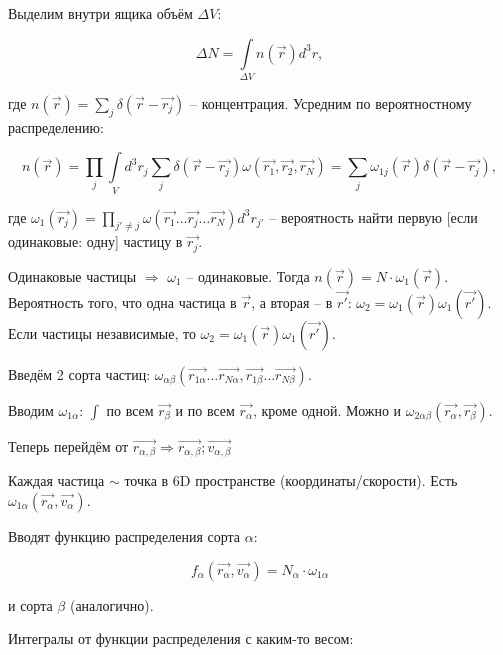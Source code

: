 \documentclass[10pt, a4paper]{article}
\numberwithin{equation}{section}
\begin{document}
Выделим внутри ящика объём $\Delta V$:

\begin{equation*}
	\Delta N = \int\limits_{\Delta V} n(\vec{r}) d^3r,
\end{equation*}

где $n(\vec{r})=\sum\limits_{j}\delta(\vec{r}-\vec{r_j})$ -- концентрация. Усредним по вероятностному распределению:

\begin{equation*}
	n(\vec{r}) = \prod\limits_{j}\int\limits_{V}d^3r_j \sum\limits_{j} \delta(\vec{r}-\vec{r_j})\omega(\vec{r_1}, \vec{r_2}, \vec{r_N}) = \sum\limits_j \omega_{1j}(\vec{r})\delta(\vec{r}-\vec{r_j}),
\end{equation*}

где $\omega_1(\vec{r_j}) = \prod\limits_{j'\neq j}\omega(\vec{r_1} \ldots \vec{r_j} \ldots \vec{r_N}) d^3r_{j'}$ -- вероятность найти первую [если одинаковые: одну] частицу в $\vec{r_j}$.

Одинаковые частицы $\Rightarrow$ $\omega_1$ -- одинаковые. Тогда $n(\vec{r}) = N\cdot\omega_1(\vec{r})$. Вероятность того, что одна частица в $\vec{r}$, а вторая -- в $\vec{r'}$: $\omega_2 = \omega_{1}(\vec{r})\omega_{1}(\vec{r'})$. Если частицы независимые, то $\omega_2 = \omega_1(\vec{r})\omega_{1}(\vec{r'})$.

Введём 2 сорта частиц: $\omega_{\alpha\beta}(\overrightarrow{r_{1\alpha}}\ldots\overrightarrow{r_{N\alpha}},\overrightarrow{r_{1\beta}}\ldots\overrightarrow{r_{N\beta}})$.

Вводим $\omega_{1\alpha}$: $\int$ по всем $\vec{r_\beta}$ и по всем $\vec{r_\alpha}$, кроме одной. Можно и $\omega_{2\alpha\beta}(\vec{r_\alpha},\vec{r_\beta})$. 

Теперь перейдём от $\overrightarrow{r_{\alpha, \beta}}\Rightarrow\overrightarrow{r_{\alpha, \beta}};\overrightarrow{v_{\alpha, \beta}}$

Каждая частица $\sim$ точка в 6D пространстве (координаты/скорости). Есть $\omega_{1\alpha}(\overrightarrow{r_\alpha}, \overrightarrow{v_\alpha})$.

Вводят функцию распределения сорта $\alpha$:

\begin{equation*}
	f_\alpha(\overrightarrow{r_\alpha}, \overrightarrow{v_\alpha}) = N_\alpha\cdot\omega_{1\alpha}
\end{equation*}

и сорта $\beta$ (аналогично).

Интегралы от функции распределения с каким-то весом:
\end{document}
